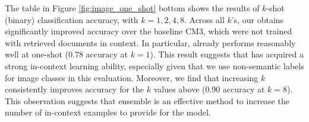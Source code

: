 The table in Figure \ref{fig:image_one_shot} bottom shows the results of $k$-shot (binary) classification accuracy, with $k=1,2,4,8$.
Across all $k$'s, our \methodname obtains significantly improved accuracy over the baseline CM3, which were not trained with retrieved documents in context. In particular, \methodname already performs reasonably well at one-shot (0.78 accuracy at $k=1$). This result suggests that \methodname has acquired a strong in-context learning ability, especially given that we use non-semantic labels for image classes in this evaluation.
Moreover, we find that increasing $k$ consistently improves accuracy for the $k$ values above (0.90 accuracy at $k=8$). 
This observation suggests that ensemble is an effective method to increase the number of in-context examples to provide for the model.

